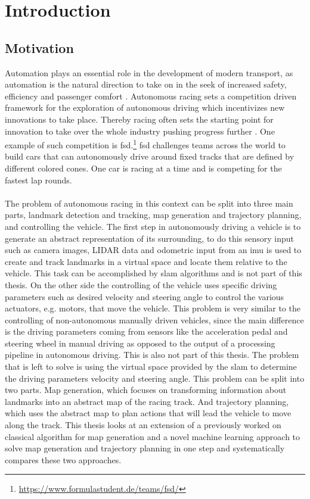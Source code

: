 \graphicspath{{Chapter/Figs/introduction/}}
\chapter{Introduction}

\section{Motivation}
Automation plays an essential role in the development of modern transport, as automation is the natural direction to take on in the seek of increased safety, efficiency and passenger comfort \cite{Lutin2018}. Autonomous racing sets a competition driven framework for the exploration of autonomous driving which incentivizes new innovations to take place. Thereby racing often sets the starting point for innovation to take over the whole industry pushing progress further \cite{Foxall91}. One example of such competition is \ac{fsd}.\footnote{\url{https://www.formulastudent.de/teams/fsd/}} \ac{fsd} challenges teams across the world to build cars that can autonomously drive around fixed tracks that are defined by different colored cones. One car is racing at a time and is competing for the fastest lap rounds.\\
\\The problem of autonomous racing in this context can be split into three main parts, landmark detection and tracking, map generation and trajectory planning, and controlling the vehicle. The first step in autonomously driving a vehicle is to generate an abstract representation of its surrounding, to do this sensory input such as camera images, LIDAR data and odometric input from an \ac{imu} is used to create and track landmarks in a virtual space and locate them relative to the vehicle. This task can be accomplished by \ac{slam} algorithms \cite{Singandhupe2019} and is not part of this thesis. On the other side the controlling of the vehicle uses specific driving parameters such as desired velocity and steering angle to control the various actuators, e.g. motors, that move the vehicle. This problem is very similar to the controlling of non-autonomous manually driven vehicles, since the main difference is the driving parameters coming from sensors like the acceleration pedal and steering wheel in manual driving as opposed to the output of a processing pipeline in autonomous driving. This is also not part of this thesis. The problem that is left to solve is using the virtual space provided by the \ac{slam} to determine the driving parameters velocity and steering angle. This problem can be split into two parts. Map generation, which focuses on transforming information about landmarks into an abstract map of the racing track. And trajectory planning, which uses the abstract map to plan actions that will lead the vehicle to move along the track. This thesis looks at an extension of a previously worked on classical algorithm for map generation and a novel machine learning approach to solve map generation and trajectory planning in one step and systematically compares these two approaches.\\
